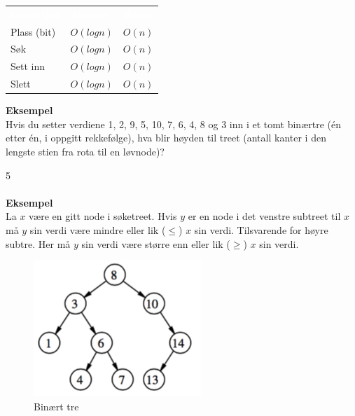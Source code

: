 \begin{table}[H]
    \label{tab:binaert}
    \centering
    \begin{tabular}{|L{10em} | L{10em}| L{10em}|}
        \hline
        \textbf{\textcolor{white}{Operasjon}} & \textbf{\textcolor{white}{Average}} & \textbf{\textcolor{white}{Worst}}\\
        Plass (bit) & $O(log n)$ & $O(n)$\\
        Søk & $O(log n)$ & $O(n)$ \\
        Sett inn & $O(log n)$ & $O(n)$ \\
        Slett & $O(log n)$ & $O(n)$ \\
         \hline
    \end{tabular}
\end{table}

\noindent \textbf{Eksempel}\\
Hvis du setter verdiene 1, 2, 9, 5, 10, 7, 6, 4, 8 og 3 inn i et tomt binærtre (én etter én, i oppgitt rekkefølge), hva blir høyden til treet (antall kanter i den lengste stien fra rota til en løvnode)?

5
\\\\
\noindent \textbf{Eksempel}\\
La $x$ være en gitt node i søketreet. Hvis $y$ er en node i det venstre subtreet til $x$ må $y$ sin verdi være mindre eller lik ($\leq$) $x$ sin verdi. Tilsvarende for høyre subtre. Her må $y$ sin verdi være større enn eller lik ($\geq$) $x$ sin verdi.

\begin{figure}[H]
\includegraphics[scale=0.7]{images/binaer}
\centering %
\caption{Binært tre}
\label{fig:binaer}
\end{figure}

